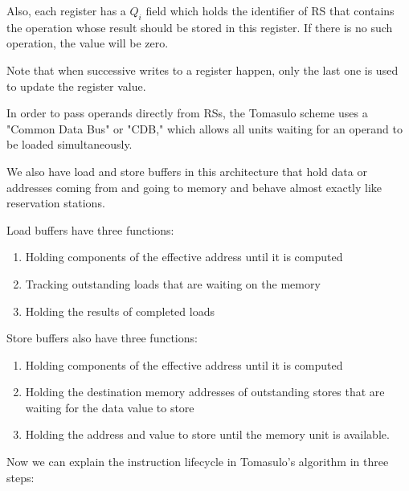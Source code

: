 \documentclass[12pt]{article}
\begin{document}
Also, each register has a $Q_i$ field which holds the identifier of RS that contains the operation whose result should be stored in this register. If there is no such operation, the value will be zero.

Note that when successive writes to a register happen, only the last one is used to update the register value.

In order to pass operands directly from RSs, the Tomasulo scheme uses a "Common Data Bus" or "CDB," which allows all units waiting for an operand to be loaded simultaneously.

We also have load and store buffers in this architecture that hold data or addresses coming from and going to memory and behave almost exactly like reservation stations.

Load buffers have three functions:
\begin{enumerate}
	\item Holding components of the effective address until it is computed
	\item Tracking outstanding loads that are waiting on the memory
	\item Holding the results of completed loads 
\end{enumerate}

Store buffers also have three functions:
\begin{enumerate}
	\item Holding components of the effective address until it is computed
	\item Holding the destination memory addresses of outstanding stores that are waiting for the data	value to store
	\item Holding the address and value to store until the memory unit is available.
\end{enumerate}


Now we can explain the instruction lifecycle in Tomasulo's algorithm in three steps:
\end{document}
